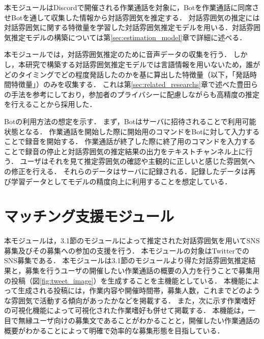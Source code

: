 本モジュールはDiscordで開催される作業通話を対象に，Botを作業通話に同席させBotを通して収集した情報から対話雰囲気を推定する．
対話雰囲気の推定には対話雰囲気に関する特徴量を学習した対話雰囲気推定モデルを用いる．対話雰囲気推定モデルの構築については第\ref{sec:estimation_model}章で詳細に述べる．

本モジュールでは，対話雰囲気推定のために音声データの収集を行う．
しかし，本研究で構築する対話雰囲気推定モデルでは言語情報を用いないため，誰がどのタイミングでどの程度発話したのかを基に算出した特徴量（以下，「発話時間特徴量」）のみを収集する．
これは第\ref{sec:related_researchs}章で述べた豊田らの手法を参考にしており，参加者のプライバシーに配慮しながらも高精度の推定を行えることから採用した．

Botの利用方法の想定を示す．
まず，Botはサーバに招待されることで利用可能状態となる．
作業通話を開始した際に開始用のコマンドをBotに対して入力することで録音を開始する．
作業通話が終了した際に終了用のコマンドを入力することで録音の停止と対話雰囲気の推定結果の出力をテキストチャンネル上に行う．
ユーザはそれを見て推定雰囲気の確認や主観的に正しいと感じた雰囲気への修正を行える．
それらのデータはサーバに記録される．記録したデータは再び学習データとしてモデルの精度向上に利用することを想定している．

\section{マッチング支援モジュール}

本モジュールは，3.1節のモジュールによって推定された対話雰囲気を用いてSNS募集及びその募集への参加の支援を行う．
本モジュールの対象はTwitterでのSNS募集である．
本モジュールは3.1節のモジュールより得た対話雰囲気推定結果と，募集を行うユーザの開催したい作業通話の概要の入力を行うことで募集用の投稿（図\ref{fig:tweet_image}）を生成することを主機能としている．
本機能によって生成される投稿には，作業内容や開催時間帯，募集人数，これまでどのような雰囲気で活動する傾向があったかなどを掲載する．
また，次に示す作業嗜好の可視化機能によって可視化された作業嗜好も併せて掲載する．
本機能は，一目で無縁ユーザ向けの募集文であることがわかることと，開催したい作業通話の概要がわかることによって明確で効率的な募集形態を目指している．

